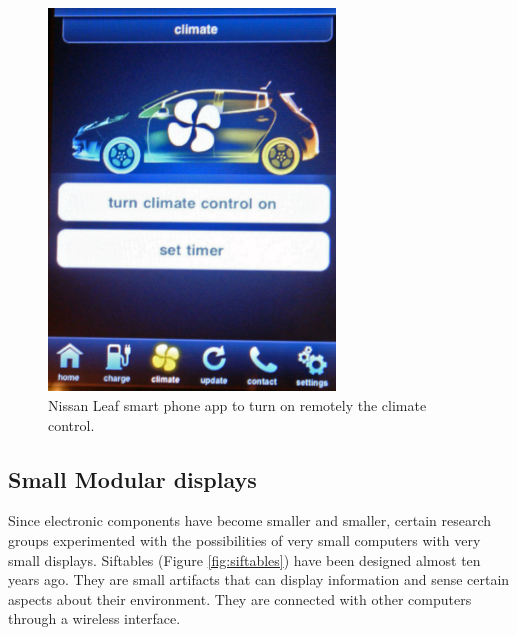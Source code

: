 
\begin{figure}[h]
\centering
	\includegraphics[keepaspectratio, width=3in]{Figures/Nissan_Leaf_mobile_app_climate_control_1713.jpg}
	\caption{Nissan Leaf smart phone app to turn on remotely the climate control.\protect\footnotemark}
	\label{fig:NissanLeaf2}
\end{figure}


\subsection{Small Modular displays}
Since electronic components have become smaller and smaller, certain research groups experimented with the possibilities of very small computers with very small displays.
Siftables (Figure \ref{fig:siftables}) have been designed almost ten years ago. They are small artifacts that can display information and sense certain aspects about their environment. They are connected with other computers through a wireless interface.~\cite{Merrill:2007:STS:1226969.1226984}

